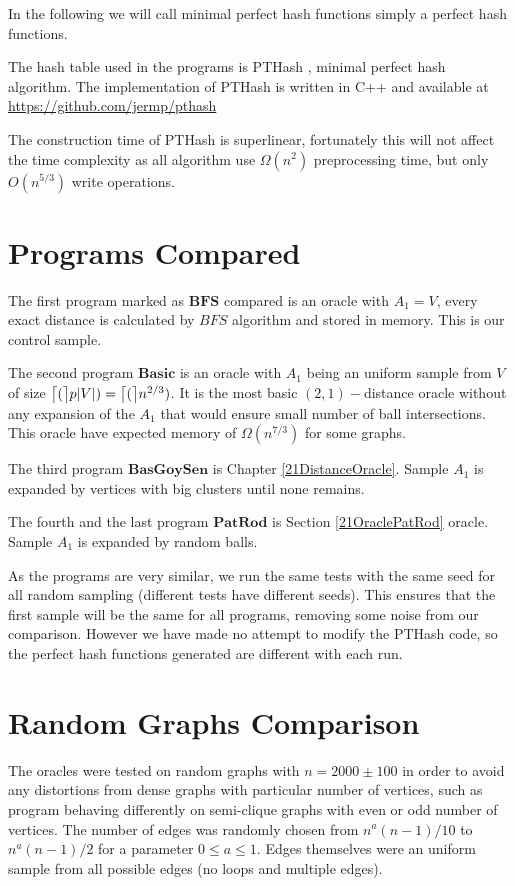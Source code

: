 \documentclass[shortabstract, lic, english]{iithesis}
\theoremstyle{definition} \newtheorem{definition}{Definition}[chapter]
\theoremstyle{plain} \newtheorem{remark}[definition]{Observation}
\theoremstyle{plain} \newtheorem{theorem}[definition]{Theorem}
\theoremstyle{plain} \newtheorem{lemma}[definition]{Lemma}
\theoremstyle{plain} \newtheorem{conjecture}[definition]{Conjecture}
\DeclarePairedDelimiter{\ceil}{\lceil}{\rceil}
\begin{document}
In the following we will call minimal perfect hash functions simply a perfect hash functions.

The hash table used in the programs is PTHash \cite{hashTablePractical}, minimal perfect hash algorithm.
The implementation of PTHash is written in C++ and available at
\newline 
\url{https://github.com/jermp/pthash}

The construction time of PTHash is superlinear, fortunately this will not affect the time complexity as all algorithm use $\Omega(n^2)$ preprocessing time,
but only $O(n^{5/3})$ write operations.

\section{Programs Compared}

The first program marked as $\mathbf{BFS}$ compared is an oracle with $A_1 = V$, 
every exact distance is calculated by $BFS$ algorithm and stored in memory.
This is our control sample.

The second program $\mathbf{Basic}$ is an oracle with $A_1$ being an uniform sample from $V$ of size $\ceil[\big](p|V|) = \ceil[\big](n^{2/3})$.
It is the most basic $(2,1)-$distance oracle without any expansion of the $A_1$ that would ensure small number of ball intersections.
This oracle have expected memory of $\Omega(n^{7/3})$ for some graphs.

The third program $\mathbf{BasGoySen}$ is Chapter \ref{21DistanceOracle}. Sample $A_1$ is expanded by vertices with big clusters until none remains.

The fourth and the last program $\mathbf{PatRod}$ is Section \ref{21OraclePatRod} oracle. Sample $A_1$ is expanded by random balls.

As the programs are very similar, we run the same tests with the same seed for all random sampling (different tests have different seeds).
This ensures that the first sample will be the same for all programs, removing some noise from our comparison.
However we have made no attempt to modify the PTHash code, so the perfect hash functions generated are different with each run.



\section{Random Graphs Comparison}

The oracles were tested on random graphs with $n = 2000 \pm 100$ in order to avoid any distortions from dense graphs with particular number of vertices, such as program behaving differently on semi-clique graphs with even or odd number of vertices.
The number of edges was randomly chosen from $n^a(n - 1)/10$ to $n^a(n-1)/2$ for a parameter $0 \leq a \leq 1$.
Edges themselves were an uniform sample from all possible edges (no loops and multiple edges).
\end{document}
